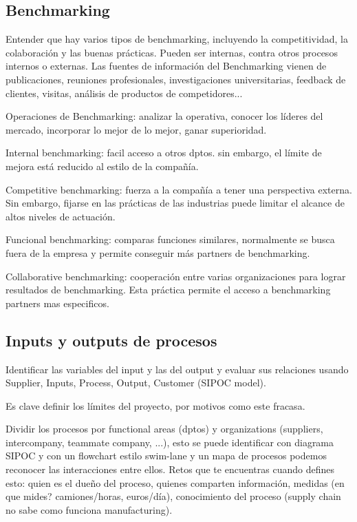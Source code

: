 \documentclass[]{article}
\begin{document}
\subsection{Benchmarking}

Entender que hay varios tipos de benchmarking, incluyendo la competitividad, la colaboración y las buenas prácticas.
Pueden ser internas, contra otros procesos internos o externas. Las fuentes de información del Benchmarking vienen de publicaciones, reuniones profesionales, investigaciones universitarias, feedback de clientes, visitas, análisis de productos de competidores...

Operaciones de Benchmarking: analizar la operativa, conocer los líderes del mercado, incorporar lo mejor de lo mejor, ganar superioridad. 

Internal benchmarking: facil acceso a otros dptos. sin embargo, el límite de mejora está reducido al estilo de la compañía.

Competitive benchmarking: fuerza a la compañía a tener una perspectiva externa. Sin embargo, fijarse en las prácticas de las industrias puede limitar el alcance de altos niveles de actuación.

Funcional benchmarking: comparas funciones similares, normalmente se busca fuera de la empresa y permite conseguir más partners de benchmarking.

Collaborative benchmarking: cooperación entre varias organizaciones para lograr resultados de benchmarking. Esta práctica permite el acceso a benchmarking partners  mas especificos.  

\subsection{Inputs y outputs de procesos}

Identificar las variables del input y las del output y evaluar sus relaciones usando Supplier, Inputs, Process, Output, Customer (SIPOC model).

Es clave definir los límites del proyecto, por motivos como este fracasa.

Dividir los procesos por functional areas (dptos) y organizations (suppliers, intercompany, teammate company, ...), esto se puede identificar con diagrama SIPOC y con un flowchart estilo swim-lane y un mapa de procesos podemos reconocer las interacciones entre ellos. Retos que te encuentras cuando defines esto: quien es el dueño del proceso, quienes comparten información, medidas (en que mides? camiones/horas, euros/día), conocimiento del proceso (supply chain no sabe como funciona manufacturing).
\end{document}
